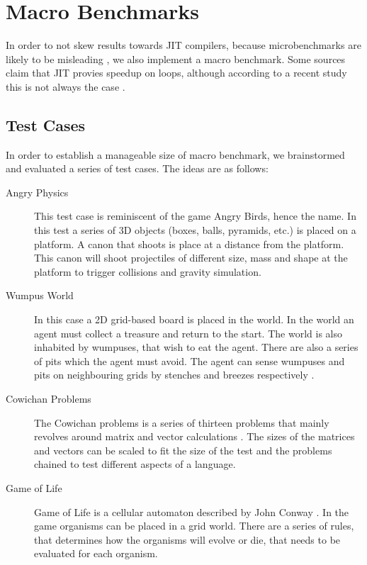 \section{Macro Benchmarks}
In order to not skew results towards \ac{JIT} compilers, because microbenchmarks are likely to be misleading \cite{sestoft2013microbenchmarks, microbenchmarkmislead}, we also implement a macro benchmark.
Some sources claim that \ac{JIT} provies speedup on loops, although according to a recent study this is not always the case \cite{vmwarmup}.



\subsection{Test Cases}
In order to establish a manageable size of macro benchmark, we brainstormed and evaluated a series of test cases. The ideas are as follows:
\begin{description}
    \item[Angry Physics] This test case is reminiscent of the game Angry Birds, hence the name. In this test a series of 3D objects (boxes, balls, pyramids, etc.) is placed on a platform. A canon that shoots is place at a distance from the platform. This canon will shoot projectiles of different size, mass and shape at the platform to trigger collisions and gravity simulation.
    \item[Wumpus World] In this case a 2D grid-based board is placed in the world. In the world an agent must collect a treasure and return to the start. The world is also inhabited by wumpuses, that wish to eat the agent. There are also a series of pits which the agent must avoid. The agent can sense wumpuses and pits on neighbouring grids by stenches and breezes respectively \cite{wumpus:world}.
    \item[Cowichan Problems] The Cowichan problems is a series of thirteen problems that mainly revolves around matrix and vector calculations \cite{wilson1995assessing}. The sizes of the matrices and vectors can be scaled to fit the size of the test and the problems chained to test different aspects of a language.
    \item[Game of Life] Game of Life is a cellular automaton described by John Conway \cite{game:of:life}. In the game organisms can be placed in a grid world. There are a series of rules, that determines how the organisms will evolve or die, that needs to be evaluated for each organism.
\end{description}

